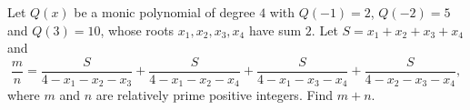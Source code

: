 Let $Q(x)$ be a monic polynomial of degree $4$ with $Q(-1)=2$, $Q(-2)=5$ and $Q(3)=10$, whose roots $x_1,x_2,x_3,x_4$ have sum $2$. Let $S=x_1+x_2+x_3+x_4$ and
\[
\dfrac {m}{n}=\dfrac{S}{4-x_1-x_2-x_3}+\dfrac{S}{4-x_1-x_2-x_4}+\dfrac{S}{4-x_1-x_3-x_4}+\dfrac{S}{4-x_2-x_3-x_4},
\]
where $m$ and $n$ are relatively prime positive integers. Find $m+n$.
